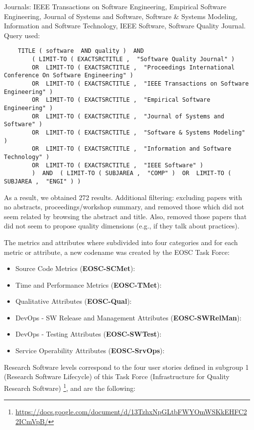 \documentclass[a4paper]{article}
\begin{document}
Journals: IEEE Transactions on Software Engineering, Empirical Software Engineering, Journal of Systems and Software, Software \& Systems Modeling, 
Information and Software Technology, IEEE Software, Software Quality Journal. Query used:

\tiny
\begin{verbatim}
    TITLE ( software  AND quality )  AND  
        ( LIMIT-TO ( EXACTSRCTITLE ,  "Software Quality Journal" )  
        OR  LIMIT-TO ( EXACTSRCTITLE ,  "Proceedings International Conference On Software Engineering" ) 
        OR  LIMIT-TO ( EXACTSRCTITLE ,  "IEEE Transactions on Software Engineering" )
        OR  LIMIT-TO ( EXACTSRCTITLE ,  "Empirical Software Engineering" ) 
        OR  LIMIT-TO ( EXACTSRCTITLE ,  "Journal of Systems and Software" ) 
        OR  LIMIT-TO ( EXACTSRCTITLE ,  "Software & Systems Modeling" ) 
        OR  LIMIT-TO ( EXACTSRCTITLE ,  "Information and Software Technology" )  
        OR  LIMIT-TO ( EXACTSRCTITLE ,  "IEEE Software" )   
        )  AND  ( LIMIT-TO ( SUBJAREA ,  "COMP" )  OR  LIMIT-TO ( SUBJAREA ,  "ENGI" ) )  
\end{verbatim}
\small

As a result, we obtained 272 results. Additional filtering: excluding papers with no abstracts, proceedings/workshop summary,
and removed those which did not seem related by browsing the abstract and title. Also, removed those papers that did not seem to propose
quality dimensions (e.g., if they talk about practices).

The metrics and attributes where subdivided into four categories and for each metric or attribute,
a new codename was created by the EOSC Task Force:

\begin{itemize}
    \item Source Code Metrics (\textbf{EOSC-SCMet}):
    \item Time and Performance Metrics (\textbf{EOSC-TMet}):
    \item Qualitative Attributes (\textbf{EOSC-Qual}):
    \item DevOps - SW Release and Management Attributes (\textbf{EOSC-SWRelMan}):
    \item DevOps - Testing Attributes (\textbf{EOSC-SWTest}):
    \item Service Operability Attributes (\textbf{EOSC-SrvOps}):
\end{itemize}

Research Software levels correspond to the four user stories defined in subgroup 1 (Research Software Lifecycle) of
this Task Force (Infrastructure for Quality Research Software) \footnote{\url{https://docs.google.com/document/d/13TzhxNpGLtbFWYOmWSKkEHFC22ICmVpB/}},
and are the following:
\end{document}
